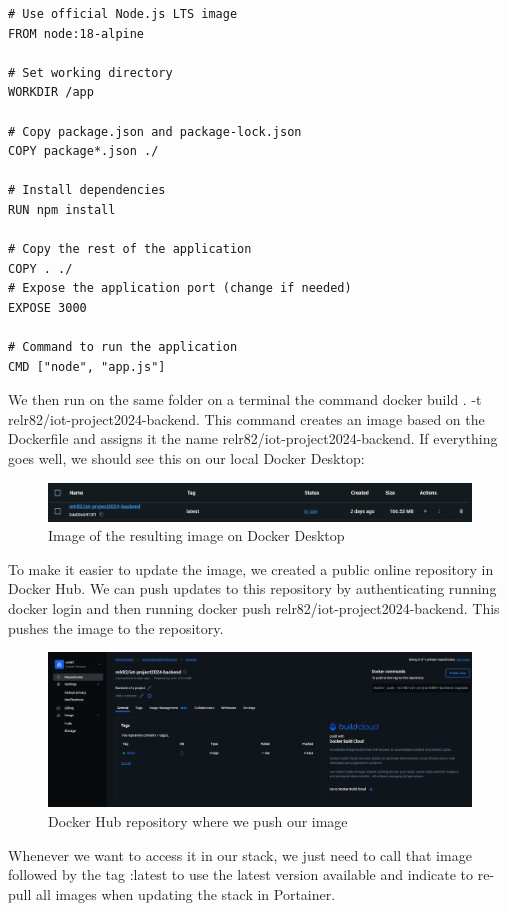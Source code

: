 \begin{lstlisting}
# Use official Node.js LTS image
FROM node:18-alpine

# Set working directory
WORKDIR /app

# Copy package.json and package-lock.json
COPY package*.json ./

# Install dependencies
RUN npm install

# Copy the rest of the application
COPY . ./
# Expose the application port (change if needed)
EXPOSE 3000

# Command to run the application
CMD ["node", "app.js"]
\end{lstlisting}

We then run on the same folder on a terminal the command docker build . -t relr82/iot-project2024-backend. This command creates an image based on the Dockerfile and assigns it the name relr82/iot-project2024-backend. If everything goes well, we should see this on our local Docker Desktop:
\begin{figure}[H]
    \centering
    \includegraphics[width=1\linewidth]{dockerdesktop.png}
    \caption{Image of the resulting image on Docker Desktop}
    \label{fig:enter-label}
\end{figure}

To make it easier to update the image, we created a public online repository in Docker Hub. We can push updates to this repository by authenticating running docker login and then running docker push relr82/iot-project2024-backend. This pushes the image to the repository.

\begin{figure}[H]
    \centering
    \includegraphics[width=0.5\linewidth]{dockerhub.png}
    \caption{Docker Hub repository where we push our image}
    \label{fig:enter-label}
\end{figure}

Whenever we want to access it in our stack, we just need to call that image followed by the tag :latest to use the latest version available and indicate to re-pull all images when updating the stack in Portainer.

